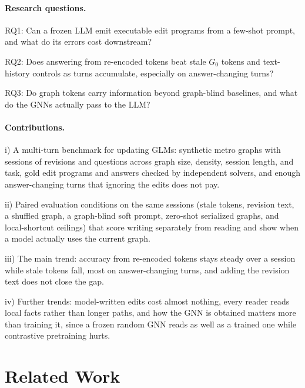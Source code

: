 \documentclass[11pt]{article}
\begin{document}
\paragraph{Research questions.}
\begin{description}[leftmargin=0.5em,style=nextline,font=\normalfont\itshape,itemsep=1pt]
  \item RQ1: Can a frozen LLM emit executable edit programs from a few-shot prompt, and what do its errors cost downstream?
  \item RQ2: Does answering from re-encoded tokens beat stale $G_0$ tokens and text-history controls as turns accumulate, especially on answer-changing turns?
  \item RQ3: Do graph tokens carry information beyond graph-blind baselines, and what do the GNNs actually pass to the LLM?
\end{description}

\paragraph{Contributions.}
\begin{description}[leftmargin=0.5em,style=nextline,font=\normalfont\itshape,itemsep=1pt]
  \item i) A multi-turn benchmark for updating GLMs: synthetic metro graphs with sessions of revisions and questions across graph size, density, session length, and task, gold edit programs and answers checked by independent solvers, and enough answer-changing turns that ignoring the edits does not pay.
  \item ii) Paired evaluation conditions on the same sessions (stale tokens, revision text, a shuffled graph, a graph-blind soft prompt, zero-shot serialized graphs, and local-shortcut ceilings) that score writing separately from reading and show when a model actually uses the current graph.
  \item iii) The main trend: accuracy from re-encoded tokens stays steady over a session while stale tokens fall, most on answer-changing turns, and adding the revision text does not close the gap.
  \item iv) Further trends: model-written edits cost almost nothing, every reader reads local facts rather than longer paths, and how the GNN is obtained matters more than training it, since a frozen random GNN reads as well as a trained one while contrastive pretraining hurts.
\end{description}

\section{Related Work}
\label{sec:lit}
\end{document}
